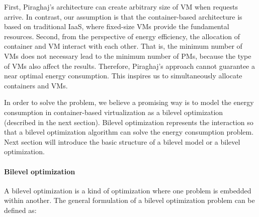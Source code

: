  First, Piraghaj's architecture can create arbitrary size of VM when requests arrive. In contrast, our assumption is that the container-based architecture is based on traditional IaaS, where fixed-size VMs provide the fundamental resources. Second, from the perspective of energy efficiency, the allocation of container and VM interact with each other. That is, the minimum number of VMs does not necessary lead to the minimum number of PMs, because the type of VMs also affect the results. Therefore, Piraghaj's approach cannot guarantee a near optimal energy consumption. This inspires us to simultaneously allocate containers and VMs. 


In order to solve the problem, we believe a promising way is to model the energy consumption in container-based virtualization as a bilevel optimization~\cite{Colson:2007bu} (described in the next section). Bilevel optimization represents the interaction so that a bilevel optimization algorithm can solve the energy consumption problem. Next section will introduce the basic structure of a bilevel model or a bilevel optimization.




\paragraph{Bilevel optimization}
\label{bilevel}

A bilevel optimization \cite{Colson:2007bu} is a kind of optimization where one problem is embedded within another.
The general formulation of a bilevel optimization problem can be defined as: 

